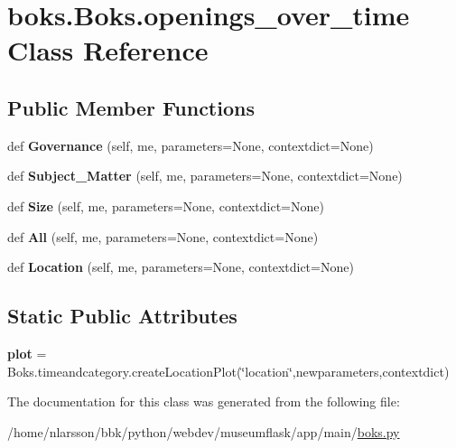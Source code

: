 \hypertarget{classboks_1_1Boks_1_1openings__over__time}{}\section{boks.\+Boks.\+openings\+\_\+over\+\_\+time Class Reference}
\label{classboks_1_1Boks_1_1openings__over__time}
\subsection*{Public Member Functions}
\begin{DoxyCompactItemize}
\item 
\mbox{\label{classboks_1_1Boks_1_1openings__over__time_a97e54b844afbc0169a0c410f493fa1cd}} 
def {\bfseries Governance} (self, me, parameters=None, contextdict=None)
\item 
\mbox{\label{classboks_1_1Boks_1_1openings__over__time_a11d4abe3e25a82d15442b9d96c27dbc9}} 
def {\bfseries Subject\+\_\+\+Matter} (self, me, parameters=None, contextdict=None)
\item 
\mbox{\label{classboks_1_1Boks_1_1openings__over__time_a8f6c212a3111dd80e82b9a620afae9e4}} 
def {\bfseries Size} (self, me, parameters=None, contextdict=None)
\item 
\mbox{\label{classboks_1_1Boks_1_1openings__over__time_a49d9253a4ff51a05bdd158d50c7d6563}} 
def {\bfseries All} (self, me, parameters=None, contextdict=None)
\item 
\mbox{\label{classboks_1_1Boks_1_1openings__over__time_abce07af38b70e31c41077546dfcc8e53}} 
def {\bfseries Location} (self, me, parameters=None, contextdict=None)
\end{DoxyCompactItemize}
\subsection*{Static Public Attributes}
\begin{DoxyCompactItemize}
\item 
\mbox{\label{classboks_1_1Boks_1_1openings__over__time_a447556f8f4eccc6bff24cfcc7f53375c}} 
{\bfseries plot} = Boks.\+timeandcategory.\+create\+Location\+Plot(\char`\"{}location\char`\"{},newparameters,contextdict)
\end{DoxyCompactItemize}


The documentation for this class was generated from the following file\+:\begin{DoxyCompactItemize}
\item 
/home/nlarsson/bbk/python/webdev/museumflask/app/main/\mbox{\hyperlink{boks_8py}{boks.\+py}}\end{DoxyCompactItemize}

